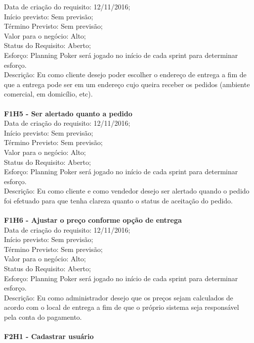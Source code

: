 \begin{apendicesenv}
\tab Data de criação do requisito: 12/11/2016;\\
\tab Início previsto: Sem previsão;\\
\tab Término Previsto: Sem previsão;\\
\tab Valor para o negócio: Alto;\\
\tab Status do Requisito: Aberto;\\
\tab Esforço: Planning Poker será jogado no início de cada sprint para determinar esforço.\\
\tab Descrição: Eu como cliente desejo poder escolher o endereço de entrega a fim de que a entrega pode ser em um endereço cujo queira receber os pedidos (ambiente comercial, em domicílio, etc).\\
\\
\textbf{F1H5 - Ser alertado quanto a pedido}\\
\tab Data de criação do requisito: 12/11/2016;\\
\tab Início previsto: Sem previsão;\\
\tab Término Previsto: Sem previsão;\\
\tab Valor para o negócio: Alto;\\
\tab Status do Requisito: Aberto;\\
\tab Esforço: Planning Poker será jogado no início de cada sprint para determinar esforço.\\
\tab Descrição: Eu como cliente e como vendedor desejo ser alertado quando o pedido foi efetuado para que tenha clareza quanto o status de aceitação do pedido.\\
\\
\textbf{F1H6 - Ajustar o preço conforme opção de entrega}\\
\tab Data de criação do requisito: 12/11/2016;\\
\tab Início previsto: Sem previsão;\\
\tab Término Previsto: Sem previsão;\\
\tab Valor para o negócio: Alto;\\
\tab Status do Requisito: Aberto;\\
\tab Esforço: Planning Poker será jogado no início de cada sprint para determinar esforço.\\
\tab Descrição: Eu como administrador desejo que os preços sejam calculados de acordo com o local de entrega a fim de que o próprio sistema seja responsável pela conta do pagamento.\\
\\
\textbf{F2H1 - Cadastrar usuário}\\

\end{apendicesenv}
